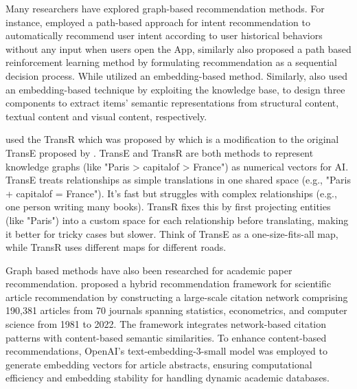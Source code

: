 \documentclass[a4paper,12pt]{article}
\begin{document}
Many researchers have explored graph-based recommendation methods. For instance,
\parencite{10.1145/3292500.3330673} employed a path-based approach for intent
recommendation to automatically recommend user intent according to user
historical behaviors without any input when users open the App,  similarly
\parencite{song2022ekarexplainablemethodknowledge} also proposed a path based
reinforcement learning method by formulating recommendation as a sequential
decision process. While \parencite{10.1145/3109859.3109889} utilized an embedding-based
method. Similarly, \parencite{10.1145/2939672.2939673} also used an embedding-based
technique by exploiting the knowledge base, to design three components to extract items'
semantic representations from structural content, textual content and visual content,
respectively.

\parencite{10.1145/2939672.2939673} used the TransR which was proposed by
\parencite{10.3233/JIFS-202177} which is a modification to the original TransE proposed
by \parencite{NIPS2013_1cecc7a7}.  TransE and TransR are both methods to represent
knowledge graphs (like "Paris > capitalof > France") as numerical vectors for AI.
TransE treats relationships as simple translations in one shared space
(e.g., "Paris + capitalof = France"). It’s fast but struggles with complex
relationships (e.g., one person writing many books). TransR fixes this by first
projecting entities (like "Paris") into a custom space for each relationship before
translating, making it better for tricky cases but slower. Think of TransE as a
one-size-fits-all map, while TransR uses different maps for different roads.

Graph based methods have also been researched for academic paper recommendation.
\parencite{liu2025academicliteraturerecommendationlargescale} proposed a hybrid
recommendation framework for scientific article recommendation by constructing a
large-scale citation network comprising 190,381 articles from 70 journals spanning
statistics, econometrics, and computer science from 1981 to 2022. The framework
integrates network-based citation patterns with content-based semantic similarities.
To enhance content-based recommendations, OpenAI’s text-embedding-3-small model was
employed to generate embedding vectors for article abstracts, ensuring computational
efficiency and embedding stability for handling dynamic academic databases.
\end{document}
